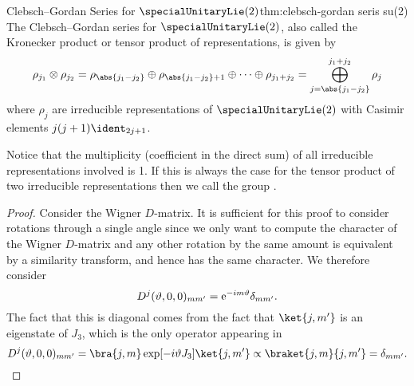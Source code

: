 \begin{thm}{Clebsch--Gordan Series for \(\specialUnitaryLie(2)\)}{thm:clebsch-gordan seris su(2)}
    The Clebsch--Gordan series for \(\specialUnitaryLie(2)\), also called the Kronecker product or tensor product of representations, is given by
    \begin{equation}
        \rho_{j_1} \directproduct \rho_{j_2} = \rho_{\abs{j_1 - j_2}} \directsum \rho_{\abs{j_1 - j_2} + 1} \directsum \dotsb \directsum \rho_{j_1 + j_2} = \bigoplus_{j = \abs{j_1 - j_2}}^{j_1 + j_2} \rho_j
    \end{equation}
    where \(\rho_{j}\) are irreducible representations of \(\specialUnitaryLie(2)\) with Casimir elements \(j(j + 1)\ident_{2j + 1}\).
    \begin{rmk}
        Notice that the multiplicity (coefficient in the direct sum) of all irreducible representations involved is 1.
        If this is always the case for the tensor product of two irreducible representations then we call the group .
    \end{rmk}
    \begin{proof}
        Consider the Wigner \(D\)-matrix.
        It is sufficient for this proof to consider rotations through a single angle since we only want to compute the character of the Wigner \(D\)-matrix and any other rotation by the same amount is equivalent by a similarity transform, and hence has the same character.
        We therefore consider
        \begin{equation}
            D^j(\vartheta, 0, 0)_{mm'} = \mathrm{e}^{-im\vartheta}\delta_{mm'}.
        \end{equation}
        The fact that this is diagonal comes from the fact that \(\ket{j, m'}\) is an eigenstate of \(J_3\), which is the only operator appearing in
        \begin{equation}
            D^j(\vartheta, 0, 0)_{mm'} = \bra{j, m} \exp[-i\vartheta J_3]\ket{j, m'} \propto \braket{j, m}{j, m'} = \delta_{mm'}.
        \end{equation}
        

\end{proof}
\end{thm}

